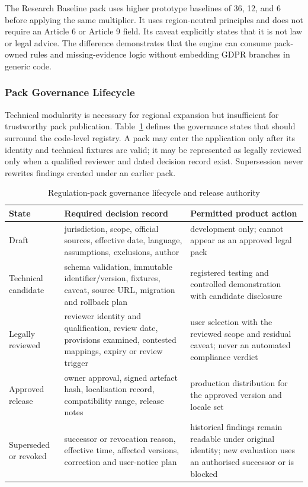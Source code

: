 The Research Baseline pack uses higher prototype baselines of 36, 12, and 6 before applying the same multiplier. It uses region-neutral principles and does not require an Article 6 or Article 9 field. Its caveat explicitly states that it is not law or legal advice. The difference demonstrates that the engine can consume pack-owned rules and missing-evidence logic without embedding GDPR branches in generic code.

\subsubsection{Pack Governance Lifecycle}

Technical modularity is necessary for regional expansion but insufficient for trustworthy pack publication. Table~\ref{tab:pack-governance-lifecycle} defines the governance states that should surround the code-level registry. A pack may enter the application only after its identity and technical fixtures are valid; it may be represented as legally reviewed only when a qualified reviewer and dated decision record exist. Supersession never rewrites findings created under an earlier pack.

\begin{table}[H]
\centering
\scriptsize
\caption{Regulation-pack governance lifecycle and release authority}
\label{tab:pack-governance-lifecycle}
\begin{tabular}{>{\raggedright\arraybackslash}p{}>{\raggedright\arraybackslash}p{}>{\raggedright\arraybackslash}p{}}
\toprule
State & Required decision record & Permitted product action \\
\midrule
Draft & jurisdiction, scope, official sources, effective date, language, assumptions, exclusions, author & development only; cannot appear as an approved legal pack \\
Technical candidate & schema validation, immutable identifier/version, fixtures, caveat, source URL, migration and rollback plan & registered testing and controlled demonstration with candidate disclosure \\
Legally reviewed & reviewer identity and qualification, review date, provisions examined, contested mappings, expiry or review trigger & user selection with the reviewed scope and residual caveat; never an automated compliance verdict \\
Approved release & owner approval, signed artefact hash, localisation record, compatibility range, release notes & production distribution for the approved version and locale set \\
Superseded or revoked & successor or revocation reason, effective time, affected versions, correction and user-notice plan & historical findings remain readable under original identity; new evaluation uses an authorised successor or is blocked \\
\bottomrule
\end{tabular}
\end{table}

